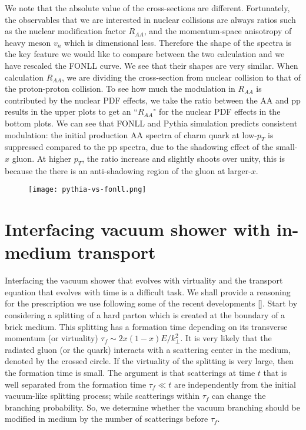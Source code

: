 We note that the absolute value of the cross-sections are different.
Fortunately, the observables that we are interested in nuclear collisions are always ratios such as the nuclear modification factor $R_{AA}$, and the momentum-space anisotropy of heavy meson $v_n$ which is dimensional less. 
Therefore the shape of the spectra is the key feature we would like to compare between the two calculation and we have rescaled the FONLL curve.
We see that their shapes are very similar.
When calculation $R_{AA}$, we are dividing the cross-section from nuclear collision to that of the proton-proton collision.
To see how much the modulation in $R_{AA}$ is contributed by the nuclear PDF effects, we take the ratio between the AA and pp results in the upper plots to get an ``$R_{AA}$" for the nuclear PDF effects in the bottom plots.
We can see that FONLL and Pythia simulation predicts consistent modulation: the initial production AA spectra of charm quark at low-$p_T$ is suppressed compared to the pp spectra, due to the shadowing effect of the small-$x$ gluon. 
At higher $p_T$, the ratio increase and slightly shoots over  unity, this is because the there is an anti-shadowing region of the gluon at larger-$x$.

\begin{figure}
\centering
\texttt{[image: pythia-vs-fonll.png]}
\caption{}
\label{fig:pythia-fonll}
\end{figure}

\section{Interfacing vacuum shower with in-medium transport}
Interfacing the vacuum shower that evolves with virtuality and the transport equation that evolves with time is a difficult task. 
We shall provide a reasoning for the prescription we use following some of the recent developments [].
Start by considering a splitting of a hard parton which is created at the boundary of a brick medium.
This splitting has a formation time depending on its transverse momentum (or virtuality) $\tau_f \sim 2x(1-x)E/k_\perp^2$.
It is very likely that the radiated gluon (or the quark) interacts with a scattering center in the medium, denoted by the crossed circle.
If the virtuality of the splitting is very large, then the formation time is small.
The argument is that scatterings at time $t$ that is well separated from the formation time $\tau_f \ll t$ are independently from the initial vacuum-like splitting process; while scatterings within $\tau_f$ can change the branching probability.
So, we determine whether the vacuum branching should be modified in medium by the number of scatterings before $\tau_f$.

